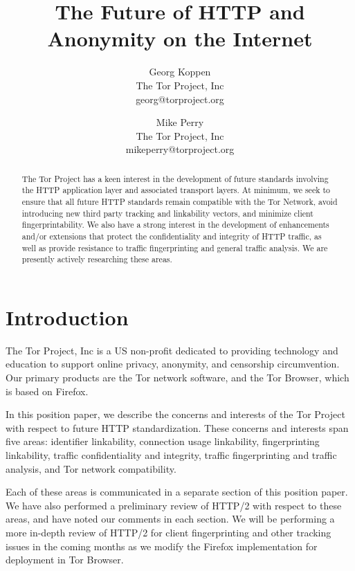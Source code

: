 \documentclass[letterpaper,11pt]{llncs}
\begin{document}
\title{The Future of HTTP and Anonymity on the Internet}

\author{Georg Koppen \\ The Tor Project, Inc \\ georg@torproject.org}
\author{Mike Perry \\ The Tor Project, Inc \\ mikeperry@torproject.org}


\maketitle
\pagestyle{plain}

\begin{abstract}

The Tor Project has a keen interest in the development of future standards
involving the HTTP application layer and associated transport layers. At
minimum, we seek to ensure that all future HTTP standards remain compatible
with the Tor Network, avoid introducing new third party tracking and
linkability vectors, and minimize client fingerprintability. We also have a
strong interest in the development of enhancements and/or extensions that
protect the confidentiality and integrity of HTTP traffic, as well as provide
resistance to traffic fingerprinting and general traffic analysis. We are
presently actively researching these areas.

\end{abstract}

\section{Introduction}

The Tor Project, Inc is a US non-profit dedicated to providing technology and
education to support online privacy, anonymity, and censorship circumvention.
Our primary products are the Tor network software, and the Tor Browser, which
is based on Firefox. 

In this position paper, we describe the concerns and interests of the Tor
Project with respect to future HTTP standardization. These concerns and
interests span five areas: identifier linkability, connection usage linkability,
fingerprinting linkability, traffic confidentiality and integrity, traffic
fingerprinting and traffic analysis, and Tor network compatibility.

Each of these areas is communicated in a separate section of this position
paper. We have also performed a preliminary review of HTTP/2 with respect to
these areas, and have noted our comments in each section. We will be
performing a more in-depth review of HTTP/2 for client fingerprinting and
other tracking issues in the coming months as we modify the Firefox
implementation for deployment in Tor Browser.
\end{document}
